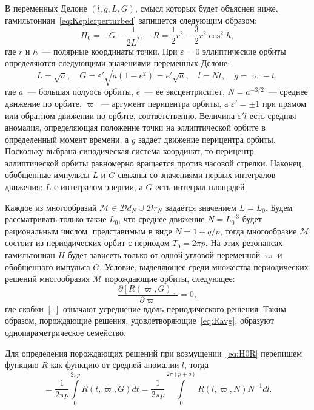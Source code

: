 \documentclass[14pt,a4paper%
]{extarticle}
\begin{document}
В переменных Делоне $(l,g,L,G)$, смысл которых будет объяснен ниже, %
гамильтониан~\eqref{eq:Keplerperturbed} запишется следующим образом:
\begin{equation}\label{eq:H0R}
H_0=-G-\frac1{2L^2},\quad R=\frac12r^2-\frac32r^2\cos^2h,
\end{equation}
где $r$ и $h$~--- полярные координаты точки. При $\varepsilon=0$ эллиптические орбиты определяются следующими значениями переменных Делоне:
\begin{equation}\label{eq:Delauneorbit}
L=\sqrt{a},\quad G=\varepsilon'\sqrt{a(1-e^2)}=e'\sqrt a,\quad l=Nt,\quad g=\varpi-t,
\end{equation}
где $a$~--- большая полуось орбиты, $e$~--- ее эксцентриситет, $N=a^{-3/2}$~--- среднее движение по орбите, $\varpi$~--- аргумент перицентра орбиты, а $\varepsilon'=\pm1$ при прямом или обратном движении по орбите, соответственно. Величина $\varepsilon'l$ есть средняя аномалия, определяющая положение точки на эллиптической орбите в определенный момент времени, а $g$ задает движение перицентра орбиты. Поскольку выбрана синодическая система координат, то перицентр эллиптической орбиты равномерно вращается против часовой стрелки. Наконец, обобщенные импульсы $L$ и $G$ связаны со значениями первых интегралов движения: $L$ с интегралом энергии, а $G$ есть интеграл площадей.

Каждое из многообразий $\mathcal M\in\mathcal Dd_N\cup\mathcal Dr_N$ задаётся значением $L=L_0$. Будем рассматривать только такие $L_0$, что среднее движение $N=L_0^{-3}$ будет рациональным числом, представимым в виде $N=1+q/p$, тогда многообразие $\mathcal M$ состоит из периодических орбит с периодом $T_0=2\pi p$. На этих резонансах гамильтониан $H$ будет зависеть только от одной угловой переменной $\varpi$ и обобщенного импульса $G$. Условие, выделяющее среди множества периодических решений многообразия $\mathcal M$ порождающие орбиты, следующее:
\begin{equation}\label{eq:Ravg}
\frac{\partial[R(\varpi,G)]}{\partial\varpi}=0,
\end{equation}
где скобки $[\cdot]$ означают усреднение вдоль периодического решения. Таким образом, порождающие решения, удовлетворяющие~\eqref{eq:Ravg}, образуют однопараметрическое семейство.

Для определения порождающих решений при возмущении~\eqref{eq:H0R} перепишем функцию $R$ как функцию от средней аномалии $l$, тогда
\begin{equation}
[R]=\frac{1}{2\pi p}\int\limits_0^{2\pi p}R(t,\varpi,G)dt=\frac{1}{2\pi p}\int\limits_0^{2\pi(p+q)}R(l,\varpi,N)N^{-1}dl.
\end{equation}
\end{document}
